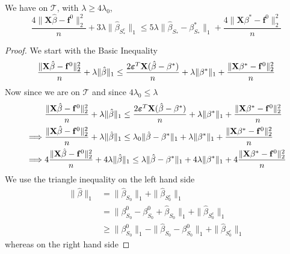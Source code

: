 \begin{lemma}
    We have on $\mathscr{T}$, with $\lambda \geq 4 \lambda_{0}$,
    \begin{equation}
        \frac{4 \|\mathbf{X} \hat{\beta}-\mathbf{f}^0\|_{2}^{2}}{n} + 3 \lambda \| \hat{\beta}_{S^{c}_{*}} \|_{1} \leq 5 \lambda \| \hat{\beta}_{S_{*}} - \beta_{S_{*}}^{*} \|_{1} + \frac{4 \|\mathbf{X} \beta^{*} - \mathbf{f}^{0} \|_{2}^{2}}{n}
    \end{equation}
\end{lemma}
\begin{proof}
    We start with the Basic Inequality
    $$
        \frac{\|\mathbf{X} \hat \beta - \mathbf{f}^0 \|_{2}^{2}}{n} + \lambda\| \hat \beta \|_{1} \leq  \frac{2 \boldsymbol{\varepsilon}^T \mathbf{X} (\hat\beta - \beta^*)}{n} + \lambda \| \beta^*\|_{1} + \frac{\|\mathbf{X} \beta^* - \mathbf{f}^0\|_{2}^{2}}{n}
    $$
    Now since we are on $\mathscr{T}$ and since $4 \lambda_0 \leq \lambda$
    \begin{align*}
                 & \frac{\|\mathbf{X} \hat \beta - \mathbf{f}^0 \|_{2}^{2}}{n} + \lambda\| \hat \beta \|_{1} \leq  \frac{2 \boldsymbol{\varepsilon}^T \mathbf{X} (\hat\beta - \beta^*)}{n} + \lambda \| \beta^*\|_{1} + \frac{\|\mathbf{X} \beta^* - \mathbf{f}^0\|_{2}^{2}}{n} \\
        \implies &
        \frac{\|\mathbf{X} \hat \beta - \mathbf{f}^0 \|_{2}^{2}}{n} + \lambda\| \hat \beta \|_{1} \leq \lambda_0 \| \hat\beta - \beta^* \|_{1} + \lambda \| \beta^*\|_{1} + \frac{\|\mathbf{X} \beta^* - \mathbf{f}^0\|_{2}^{2}}{n}            \\
        \implies &
        4 \frac{\| \mathbf{X} \hat \beta - \mathbf{f}^0 \|_{2}^{2}}{n} + 4 \lambda\| \hat \beta \|_{1} \leq \lambda \| \hat\beta - \beta^* \|_{1} + 4 \lambda \| \beta^*\|_{1} + 4\frac{\|\mathbf{X} \beta^* - \mathbf{f}^0\|_{2}^{2}}{n}            \\
    \end{align*}
    We use the triangle inequality on the left hand side
    \begin{align*}
        \|\hat{\beta}\|_{1}
         & = \|\hat{\beta}_{S_{0}} \|_{1} + \|\hat{\beta}_{S_{0}^{c}} \|_{1}                                                  \\
         & = \|\beta_{S_{0}}^{0} - \beta_{S_{0}}^{0} + \hat{\beta}_{S_{0}} \|_{1} + \|\hat{\beta}_{S_{0}^{c}} \|_{1}          \\
         & \geq \|\beta_{S_{0}}^{0} \|_{1} - \|\hat{\beta}_{S_{0}}-\beta_{S_{0}}^{0} \|_{1}+ \|\hat{\beta}_{S_{0}^{c}} \|_{1}
    \end{align*}
    whereas on the right hand side

\end{proof}
